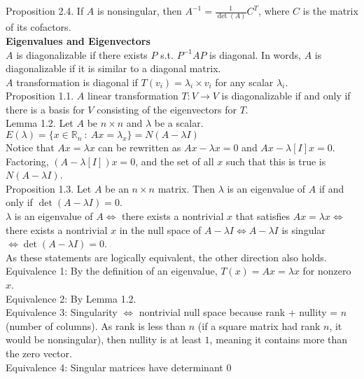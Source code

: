 \documentclass[12pt]{article}
\begin{document}
Proposition 2.4. 
If $A$ is nonsingular, then $A^{-1} = \frac{1}{\det(A)} C^{T}$, where $C$ is the matrix of its cofactors.\\

\textbf{Eigenvalues and Eigenvectors}\\

$A$ is diagonalizable if there exists $P$ s.t. $P^{-1}AP$ is diagonal. In words, $A$ is diagonalizable if it is similar to a diagonal matrix.\\ 
$A$ transformation is diagonal if $T(v_i) = \lambda_i \times v_i$ for any scalar $\lambda_i$.\\

Proposition 1.1. $A$ linear transformation $T: V \to V$ is diagonalizable if and only if there is a basis for $V$ consisting of the eigenvectors for $T$.\\

Lemma 1.2. Let $A$ be $n \times n$ and $\lambda$ be a scalar. $E(\lambda) = \{x \in \mathbb{R}_n ~: ~ A x = \lambda_x \} = N(A- \lambda I)$ \\
Notice that $Ax= \lambda x$ can be rewritten as $Ax-\lambda x = 0$ and $Ax-\lambda [I] x = 0.$\\
Factoring, $(A- \lambda [I])x = 0$, and the set of all $x$ such that this is true is $N(A- \lambda I)$.\\

Proposition 1.3. Let $A$ be an $n \times n$ matrix. Then $\lambda$ is an eigenvalue of $A$ if and only if $\det (A - \lambda I) = 0$.\\
$\lambda$ is an eigenvalue of $A \Leftrightarrow$ there exists a nontrivial $x$ that satisfies $Ax = \lambda x \Leftrightarrow$ there exists a nontrivial $x$ in the null space of $A - \lambda I \Leftrightarrow A - \lambda I$ is singular $\Leftrightarrow \det(A - \lambda I) = 0$.\\
As these statements are logically equivalent, the other direction also holds.\\
Equivalence 1: By the definition of an eigenvalue, $T(x) = Ax = \lambda x$ for nonzero $x$.\\
Equivalence 2: By Lemma 1.2.\\
Equivalence 3: Singularity $\Leftrightarrow$ nontrivial null space because rank + nullity = $n$ (number of columns). As rank is less than $n$ (if a square matrix had rank $n$, it would be nonsingular), then nullity is at least $1$, meaning it contains more than the zero vector.\\
Equivalence 4: Singular matrices have determinant 0\\
\end{document}
